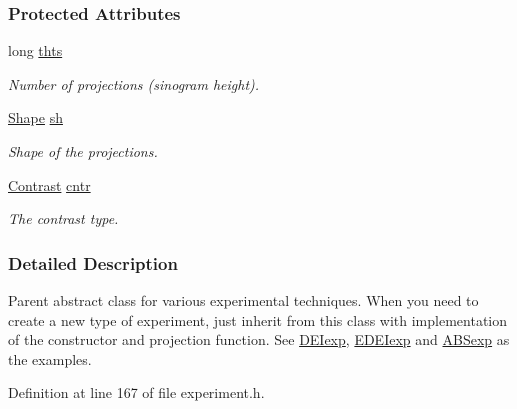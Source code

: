 \subsubsection*{Protected Attributes}
\begin{DoxyCompactItemize}
\item 
long \hyperlink{classExperiment_a70638a31b46407c2d58ca5c7055e6db4}{thts}
\begin{DoxyCompactList}\small\item\em Number of projections (sinogram height). \item\end{DoxyCompactList}\item 
\hyperlink{group__Types_ga777964671cb4315ce8c56c920db031e3}{Shape} \hyperlink{classExperiment_a49f72b0d8d927296de2e048221a87e85}{sh}
\begin{DoxyCompactList}\small\item\em Shape of the projections. \item\end{DoxyCompactList}\item 
\hyperlink{classContrast}{Contrast} \hyperlink{classExperiment_a33681f3d1524923e4936daed9ac4bac4}{cntr}
\begin{DoxyCompactList}\small\item\em The contrast type. \item\end{DoxyCompactList}\end{DoxyCompactItemize}


\subsubsection{Detailed Description}
Parent abstract class for various experimental techniques. When you need to create a new type of experiment, just inherit from this class with implementation of the constructor and projection function. See \hyperlink{classDEIexp}{DEIexp}, \hyperlink{classEDEIexp}{EDEIexp} and \hyperlink{classABSexp}{ABSexp} as the examples. 

Definition at line 167 of file experiment.h.



